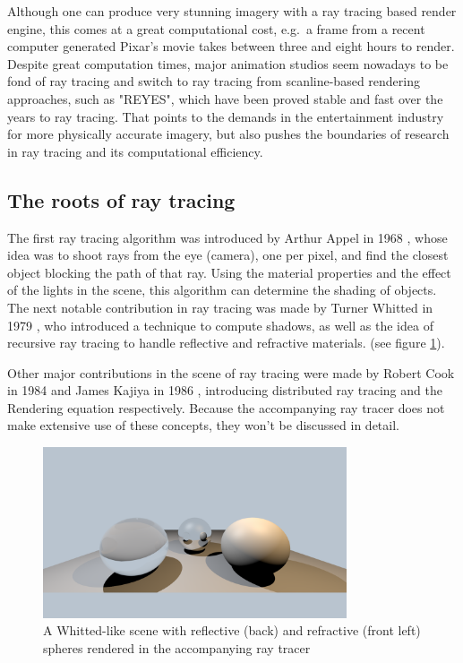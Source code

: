 \documentclass{article}
\begin{document}
Although one can produce very stunning imagery with a ray tracing based render engine, this  comes at a great computational cost, e.g.\ a frame from a recent computer generated Pixar's movie takes between three and eight hours to render. \cite{pixarRentime} \\
Despite great computation times, major animation studios seem nowadays to be fond of ray tracing and switch to ray tracing from scanline-based rendering approaches, such as "REYES", which have been proved stable and fast over the years to ray tracing. \cite{pixarSwitch} That points to the demands in the entertainment industry for more physically accurate imagery, but also pushes the boundaries of research in ray tracing and its computational efficiency. \cite{disneyHyperion}

\subsection{The roots of ray tracing}
The first ray tracing algorithm was introduced by Arthur Appel in 1968 \cite{appel}, whose idea was to shoot rays from the eye (camera), one per pixel, and find the closest object blocking the path of that ray. Using the material properties and the effect of the lights in the scene, this algorithm can determine the shading of objects. \\
The next notable contribution in ray tracing was made by Turner Whitted in 1979 \cite{whitted}, who introduced a technique to compute shadows, as well as the idea of recursive ray tracing to handle reflective and refractive materials. (see figure \ref{fig:whitted_example}).  

Other major contributions in the scene of ray tracing were made by Robert Cook in 1984 \cite{cook} and James Kajiya in 1986 \citep{kajiya}, introducing distributed ray tracing and the Rendering equation respectively. Because the accompanying ray tracer does not make extensive use of these concepts, they won't be discussed in detail.

\begin{figure}[h]
	\centering
    \includegraphics[width=0.8\textwidth]{whitted_example}
    \caption{A Whitted-like scene with reflective (back) and refractive (front left) spheres rendered in the accompanying ray tracer}
    \label{fig:whitted_example}
\end{figure}
\end{document}
